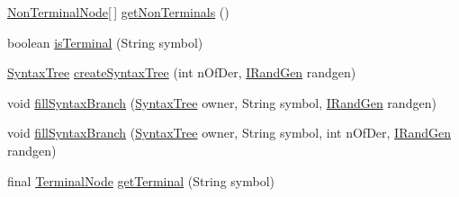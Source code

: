 \begin{DoxyCompactItemize}
\item 
\hyperlink{classnet_1_1sf_1_1jclec_1_1syntaxtree_1_1_non_terminal_node}{Non\-Terminal\-Node}\mbox{[}$\,$\mbox{]} \hyperlink{classnet_1_1sf_1_1jclec_1_1syntaxtree_1_1_syntax_tree_schema_a04185fbde34c1ae5060752c7abaeb657}{get\-Non\-Terminals} ()
\item 
boolean \hyperlink{classnet_1_1sf_1_1jclec_1_1syntaxtree_1_1_syntax_tree_schema_ab9fccdd1e34811e4c561390faff341d0}{is\-Terminal} (String symbol)
\item 
\hyperlink{classnet_1_1sf_1_1jclec_1_1syntaxtree_1_1_syntax_tree}{Syntax\-Tree} \hyperlink{classnet_1_1sf_1_1jclec_1_1syntaxtree_1_1_syntax_tree_schema_a12d9ea12a41fb9e1b785dadc319b3246}{create\-Syntax\-Tree} (int n\-Of\-Der, \hyperlink{interfacenet_1_1sf_1_1jclec_1_1util_1_1random_1_1_i_rand_gen}{I\-Rand\-Gen} randgen)
\item 
void \hyperlink{classnet_1_1sf_1_1jclec_1_1syntaxtree_1_1_syntax_tree_schema_afd8e929ecbdf111e77cd013b5e706bf8}{fill\-Syntax\-Branch} (\hyperlink{classnet_1_1sf_1_1jclec_1_1syntaxtree_1_1_syntax_tree}{Syntax\-Tree} owner, String symbol, \hyperlink{interfacenet_1_1sf_1_1jclec_1_1util_1_1random_1_1_i_rand_gen}{I\-Rand\-Gen} randgen)
\item 
void \hyperlink{classnet_1_1sf_1_1jclec_1_1syntaxtree_1_1_syntax_tree_schema_a18420a49092db89c58dec29bfbeec7bd}{fill\-Syntax\-Branch} (\hyperlink{classnet_1_1sf_1_1jclec_1_1syntaxtree_1_1_syntax_tree}{Syntax\-Tree} owner, String symbol, int n\-Of\-Der, \hyperlink{interfacenet_1_1sf_1_1jclec_1_1util_1_1random_1_1_i_rand_gen}{I\-Rand\-Gen} randgen)
\item 
final \hyperlink{classnet_1_1sf_1_1jclec_1_1syntaxtree_1_1_terminal_node}{Terminal\-Node} \hyperlink{classnet_1_1sf_1_1jclec_1_1syntaxtree_1_1_syntax_tree_schema_aaff3207028b6e36f2b63933f51b19860}{get\-Terminal} (String symbol)
\end{DoxyCompactItemize}
